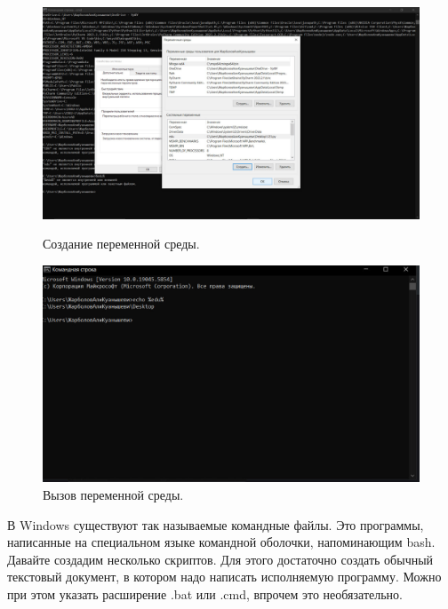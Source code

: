 \begin{figure}[h!]

\end{figure}
\begin{figure}[h!]
    \centering
    \begin{minipage}[p]{0.45\linewidth}
    \centering
    \includegraphics[width=1\linewidth]{Pic/lab1/photo_2025-05-21_08-15-44.jpg}
    \caption{Создание переменной среды.}
    \label{fig:varenv}
    \end{minipage}
    \hfill
    \begin{minipage}[p]{0.45\linewidth}
    \centering
    \includegraphics[width=1\linewidth]{Pic/lab1/photo_2025-05-21_08-15-46.jpg}
    \caption{Вызов переменной среды.}
    \label{fig:varenvcall}
    \end{minipage}
\end{figure}

В Windows существуют так называемые командные файлы. Это программы, написанные на специальном языке командной оболочки, напоминающим bash. Давайте создадим несколько скриптов. Для этого достаточно создать обычный текстовый документ, в котором надо написать исполняемую программу. Можно при этом указать расширение .bat или .cmd, впрочем это необязательно.

